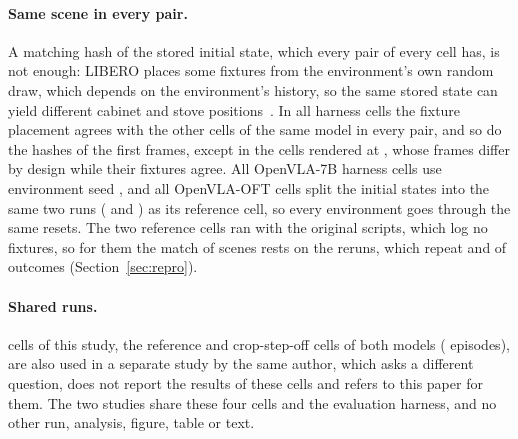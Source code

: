 \paragraph{Same scene in every pair.} A matching hash of the stored initial state, which every pair of every cell has, is not enough: LIBERO places some fixtures from the environment's own random draw, which depends on the environment's history, so the same stored state can yield different cabinet and stove positions~\citep{issue342}. In all \SceneCells{} harness cells the fixture placement agrees with the other cells of the same model in every pair, and so do the hashes of the first frames, except in the cells rendered at \InputRes, whose frames differ by design while their fixtures agree. All OpenVLA-7B harness cells use environment seed \EnvSeed, and all OpenVLA-OFT cells split the initial states into the same two runs (\SplitA{} and \SplitB) as its reference cell, so every environment goes through the same resets. The two reference cells ran with the original scripts, which log no fixtures, so for them the match of scenes rests on the reruns, which repeat \SevRerunSame{} and \OftRerunSame{} of \NPairs{} outcomes (Section~\ref{sec:repro}).

\paragraph{Shared runs.} \SharedCells{} cells of this study, the reference and crop-step-off cells of both models (\SharedEpisodes{} episodes), are also used in a separate study by the same author, which asks a different question, does not report the results of these cells and refers to this paper for them. The two studies share these four cells and the evaluation harness, and no other run, analysis, figure, table or text.
